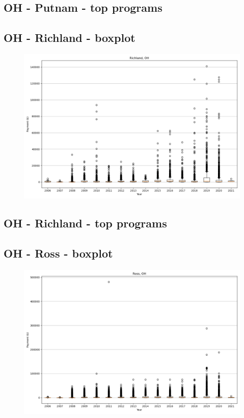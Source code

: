 \subsection*{OH - Putnam - top programs}

\newpage
\subsection*{OH - Richland - boxplot}
\begin{figure}[h]
\centering
\includegraphics[width=7in]{../output/boxplots/counties/Richland-OH_boxplot.png}
\end{figure}


\subsection*{OH - Richland - top programs}

\newpage
\subsection*{OH - Ross - boxplot}
\begin{figure}[h]
\centering
\includegraphics[width=7in]{../output/boxplots/counties/Ross-OH_boxplot.png}
\end{figure}


